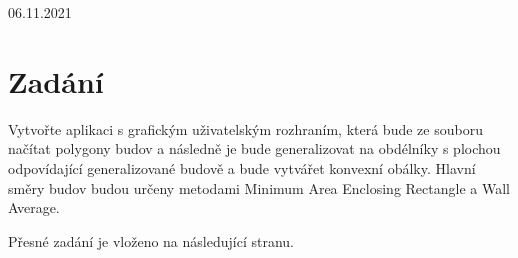 \documentclass[11pt]{article}
\begin{document}
\begin{titlepage}
		{\large 06.11.2021} %
		
		
		
		
		\vfill %
		
	\end{titlepage}
	
	
	
	
	\tableofcontents
	
	\clearpage
	
	
	\section{Zadání}
	Vytvořte aplikaci s grafickým uživatelským rozhraním, která bude ze souboru načítat polygony budov a následně je bude generalizovat na obdélníky s plochou odpovídající generalizované budově a bude vytvářet konvexní obálky. Hlavní směry budov budou určeny metodami Minimum Area Enclosing Rectangle a Wall Average.
	
	Přesné zadání je vloženo na následující stranu.
	
	
	
	
	
	
	
	
	
	
\end{document}
